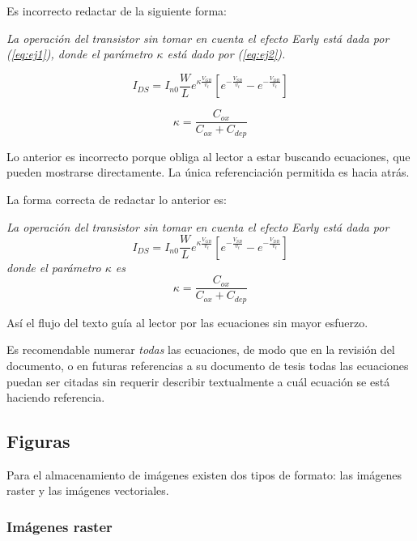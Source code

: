 Es incorrecto redactar de la siguiente forma: 

\textsl{La operación del transistor sin tomar en cuenta el efecto Early está
  dada por (\ref{eq:ej1}), donde el parámetro $\kappa$ está dado por
  (\ref{eq:ej2}).}

\begin{equation} \label{eq:ej1}
  I_{DS}
  =
  I_{n0} \frac{W}{L}e^{\kappa \frac{V_{GB}}{v_t}}
  \left[
    e^{-\frac{V_{SB}}{v_t}}
    -
    e^{-\frac{V_{DB}}{v_t}}
  \right]
\end{equation}

\begin{equation} \label{eq:ej2}
  \kappa = \frac{C_{ox}}{C_{ox}+C_{dep}}
\end{equation}

Lo anterior es incorrecto porque obliga al lector a estar buscando ecuaciones,
que pueden mostrarse directamente.  La única referenciación permitida es hacia
atrás.

La forma correcta de redactar lo anterior es: 

\textsl{La operación del transistor sin tomar en cuenta el efecto Early está
  dada por}
\begin{equation} \label{eq:ej3}
  I_{DS}
  =
  I_{n0} \frac{W}{L}e^{\kappa \frac{V_{GB}}{v_t}}
  \left[
    e^{-\frac{V_{SB}}{v_t}}
    -
    e^{-\frac{V_{DB}}{v_t}}
  \right]
\end{equation}
\textsl{donde el parámetro $\kappa$ es}
\begin{equation} \label{eq:ej4}
  \kappa = \frac{C_{ox}}{C_{ox}+C_{dep}}
\end{equation}

Así el flujo del texto guía al lector por las ecuaciones sin mayor esfuerzo.

Es recomendable numerar \emph{todas} las ecuaciones, de modo que en la revisión
del documento, o en futuras referencias a su documento de tesis todas las
ecuaciones puedan ser citadas sin requerir describir textualmente a cuál
ecuación se está haciendo referencia.

\subsection{Figuras}

Para el almacenamiento de imágenes existen dos tipos de formato: las imágenes
raster y las imágenes vectoriales.

\subsubsection{Imágenes raster}

